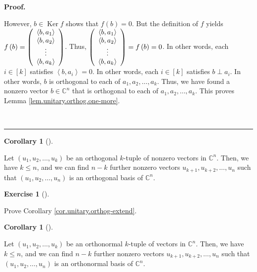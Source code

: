 \documentclass[numbers=enddot,12pt,final,onecolumn,notitlepage]{scrartcl}%
\newcounter{exer}
\numberwithin{exer}{subsection}
\theoremstyle{definition}
\newtheorem{coro}[theo]{Corollary}
\newenvironment{corollary}[1][]
{\begin{coro}[#1]\begin{leftbar}}
{\end{leftbar}\end{coro}}
\newtheorem{exmp}[exer]{Exercise}
\newenvironment{exercise}[1][]
{\begin{exmp}[#1]\begin{leftbar}}
{\end{leftbar}\end{exmp}}
\newenvironment{fineprint}{\medskip \begin{small}}{\end{small} \medskip}
\newenvironment{proof}[1][Proof]{\noindent\textbf{#1.} }{\ \rule{0.5em}{0.5em}}
\begin{document}
\begin{proof}
\begin{fineprint}
However, $b\in\operatorname*{Ker}f$ shows that $f\left(  b\right)  =0$. But
the definition of $f$ yields $f\left(  b\right)  =\left(
\begin{array}
[c]{c}%
\left\langle b,a_{1}\right\rangle \\
\left\langle b,a_{2}\right\rangle \\
\vdots\\
\left\langle b,a_{k}\right\rangle
\end{array}
\right)  $. Thus, $\left(
\begin{array}
[c]{c}%
\left\langle b,a_{1}\right\rangle \\
\left\langle b,a_{2}\right\rangle \\
\vdots\\
\left\langle b,a_{k}\right\rangle
\end{array}
\right)  =f\left(  b\right)  =0$. In other words, each $i\in\left[  k\right]
$ satisfies $\left\langle b,a_{i}\right\rangle =0$. In other words, each
$i\in\left[  k\right]  $ satisfies $b\perp a_{i}$. In other words, $b$ is
orthogonal to each of $a_{1},a_{2},\ldots,a_{k}$. Thus, we have found a
nonzero vector $b\in\mathbb{C}^{n}$ that is orthogonal to each of $a_{1}%
,a_{2},\ldots,a_{k}$. This proves Lemma \ref{lem.unitary.orthog.one-more}.
\end{fineprint}
\end{proof}

\begin{corollary}
\label{cor.unitary.orthog-extend}Let $\left(  u_{1},u_{2},\ldots,u_{k}\right)
$ be an orthogonal $k$-tuple of nonzero vectors in $\mathbb{C}^{n}$. Then, we
have $k\leq n$, and we can find $n-k$ further nonzero vectors $u_{k+1}%
,u_{k+2},\ldots,u_{n}$ such that $\left(  u_{1},u_{2},\ldots,u_{n}\right)  $
is an orthogonal basis of $\mathbb{C}^{n}$.
\end{corollary}

\begin{exercise}
\label{exe.unitary.orthog-extend} Prove Corollary
\ref{cor.unitary.orthog-extend}.
\end{exercise}

\begin{corollary}
\label{cor.unitary.orthon-extend}Let $\left(  u_{1},u_{2},\ldots,u_{k}\right)
$ be an orthonormal $k$-tuple of vectors in $\mathbb{C}^{n}$. Then, we have
$k\leq n$, and we can find $n-k$ further nonzero vectors $u_{k+1}%
,u_{k+2},\ldots,u_{n}$ such that $\left(  u_{1},u_{2},\ldots,u_{n}\right)  $
is an orthonormal basis of $\mathbb{C}^{n}$.
\end{corollary}
\end{document}

